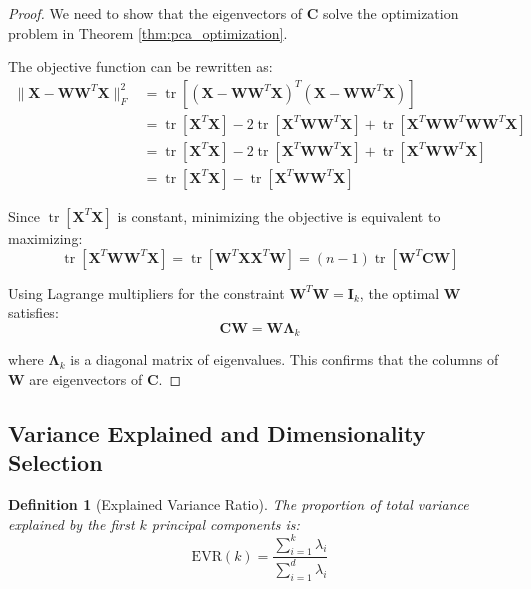 \documentclass[12pt]{article}
\renewcommand{\vec}[1]{\mathbf{#1}}
\DeclareMathOperator{\tr}{tr}
\newtheorem{definition}[theorem]{Definition}
\begin{document}
\begin{proof}
    We need to show that the eigenvectors of $\vec{C}$ solve the optimization problem in Theorem \ref{thm:pca_optimization}.

    The objective function can be rewritten as:
    \begin{align}
        \|\vec{X} - \vec{W}\vec{W}^T\vec{X}\|_F^2 & = \tr[(\vec{X} - \vec{W}\vec{W}^T\vec{X})^T(\vec{X} - \vec{W}\vec{W}^T\vec{X})]                                          \\
                                                  & = \tr[\vec{X}^T\vec{X}] - 2\tr[\vec{X}^T\vec{W}\vec{W}^T\vec{X}] + \tr[\vec{X}^T\vec{W}\vec{W}^T\vec{W}\vec{W}^T\vec{X}] \\
                                                  & = \tr[\vec{X}^T\vec{X}] - 2\tr[\vec{X}^T\vec{W}\vec{W}^T\vec{X}] + \tr[\vec{X}^T\vec{W}\vec{W}^T\vec{X}]                 \\
                                                  & = \tr[\vec{X}^T\vec{X}] - \tr[\vec{X}^T\vec{W}\vec{W}^T\vec{X}]
    \end{align}

    Since $\tr[\vec{X}^T\vec{X}]$ is constant, minimizing the objective is equivalent to maximizing:
    \begin{equation}
        \tr[\vec{X}^T\vec{W}\vec{W}^T\vec{X}] = \tr[\vec{W}^T\vec{X}\vec{X}^T\vec{W}] = (n-1)\tr[\vec{W}^T\vec{C}\vec{W}]
    \end{equation}

    Using Lagrange multipliers for the constraint $\vec{W}^T\vec{W} = \vec{I}_k$, the optimal $\vec{W}$ satisfies:
    \begin{equation}
        \vec{C}\vec{W} = \vec{W}\vec{\Lambda}_k
    \end{equation}

    where $\vec{\Lambda}_k$ is a diagonal matrix of eigenvalues. This confirms that the columns of $\vec{W}$ are eigenvectors of $\vec{C}$.
\end{proof}

\subsection{Variance Explained and Dimensionality Selection}


\begin{definition}[Explained Variance Ratio]
    The proportion of total variance explained by the first $k$ principal components is:
    \begin{equation}
        \text{EVR}(k) = \frac{\sum_{i=1}^k \lambda_i}{\sum_{i=1}^d \lambda_i}
    \end{equation}
\end{definition}
\end{document}
